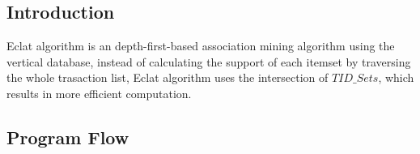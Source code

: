 \documentclass[a4paper, oneside, final, 12pt]{scrartcl} %
\begin{document}
\subsection{Introduction}

Eclat algorithm is an depth-first-based association mining algorithm 
using the vertical database, instead of calculating the support of each itemset by
traversing the whole trasaction list, Eclat algorithm uses the intersection of $TID\_Sets$,
which results in more efficient computation.

\subsection{Program Flow}



\end{document}
